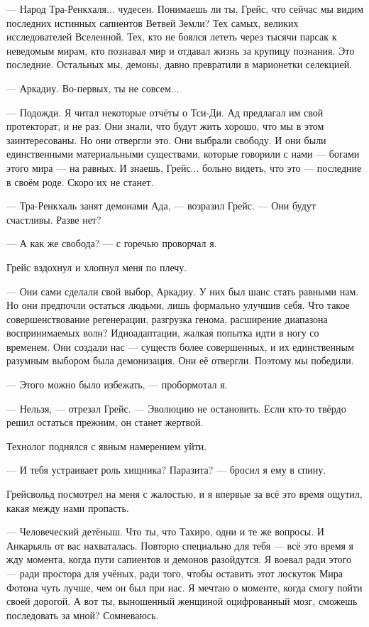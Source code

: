 --- Народ Тра-Ренкхаля... чудесен.
Понимаешь ли ты, Грейс, что сейчас мы видим последних истинных сапиентов Ветвей Земли?
Тех самых, великих исследователей Вселенной.
Тех, кто не боялся лететь через тысячи парсак к неведомым мирам, кто познавал мир и отдавал жизнь за крупицу познания.
Это последние.
Остальных мы, демоны, давно превратили в марионетки селекцией.

--- Аркадиу.
Во-первых, ты не совсем...

--- Подожди.
Я читал некоторые отчёты о Тси-Ди.
Ад предлагал им свой протекторат, и не раз.
Они знали, что будут жить хорошо, что мы в этом заинтересованы.
Но они отвергли это.
Они выбрали свободу.
И они были единственными материальными существами, которые говорили с нами --- богами этого мира --- на равных.
И знаешь, Грейс... больно видеть, что это --- последние в своём роде.
Скоро их не станет.

--- Тра-Ренкхаль занят демонами Ада, --- возразил Грейс.
--- Они будут счастливы.
Разве нет?

--- А как же свобода? --- с горечью проворчал я.

Грейс вздохнул и хлопнул меня по плечу.

--- Они сами сделали свой выбор, Аркадиу.
У них был шанс стать равными нам.
Но они предпочли остаться людьми, лишь формально улучшив себя.
Что такое совершенствование регенерации, разгрузка генома, расширение диапазона воспринимаемых волн?
Идиоадаптации, жалкая попытка идти в ногу со временем.
Они создали нас --- существ более совершенных, и их единственным разумным выбором была демонизация.
Они её отвергли.
Поэтому мы победили.

--- Этого можно было избежать, --- пробормотал я.

--- Нельзя, --- отрезал Грейс.
--- Эволюцию не остановить.
Если кто-то твёрдо решил остаться прежним, он станет жертвой.

Технолог поднялся с явным намерением уйти.

--- И тебя устраивает роль хищника?
Паразита? --- бросил я ему в спину.

Грейсвольд посмотрел на меня с жалостью, и я впервые за всё это время ощутил, какая между нами пропасть.

--- Человеческий детёныш.
Что ты, что Тахиро, одни и те же вопросы.
И Анкарьяль от вас нахваталась.
Повторю специально для тебя --- всё это время я жду момента, когда пути сапиентов и демонов разойдутся.
Я воевал ради этого --- ради простора для учёных, ради того, чтобы оставить этот лоскуток Мира Фотона чуть лучше, чем он был при нас.
Я мечтаю о моменте, когда смогу пойти своей дорогой.
А вот ты, выношенный женщиной оцифрованный мозг, сможешь последовать за мной?
Сомневаюсь.

